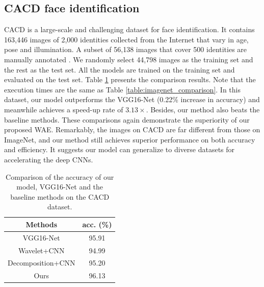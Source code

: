 \documentclass[letterpaper]{article} %
\begin{document}
\vspace{-1.67mm}
\vspace{-2.78mm}
\subsection{CACD face identification}
CACD is a large-scale and challenging dataset for face identification. It contains 163,446 images of 2,000 identities collected from the Internet that vary in age, pose and illumination. A subset of 56,138 images that cover 500 identities are manually annotated \cite{lin2017active}. We randomly select 44,798 images as the training set and the rest as the test set. All the models are trained on the training set and evaluated on the test set. Table \ref{table:cacd_comparison} presents the comparison results. Note that the execution times are the same as Table \ref{table:imagenet_comparison}. In this dataset, our model outperforms the VGG16-Net (0.22\% increase in accuracy) and meanwhile achieves a speed-up rate of $3.13\times$. Besides, our method also beats the baseline methods. These comparisons again demonstrate the superiority of our proposed WAE. Remarkably, the images on CACD are far different from those on ImageNet, and our method still achieves superior performance on both accuracy and efficiency. It suggests our model can generalize to diverse datasets for accelerating the deep CNNs.


\begin{table}[htbp]
\centering
\begin{tabular}{c|c}
\hline
\centering  Methods  & acc. (\%) \\
\hline
\hline
VGG16-Net    & 95.91   \\
Wavelet+CNN      &   94.99  \\
Decomposition+CNN      &   95.20 \\
Ours   & 96.13   \\
\hline
\end{tabular}
\caption{Comparison of the accuracy of our model, VGG16-Net and the baseline methods on the CACD dataset.}
\label{table:cacd_comparison}
\end{table}


\vspace{-0.77mm}
\vspace{-1.51mm}
\end{document}
